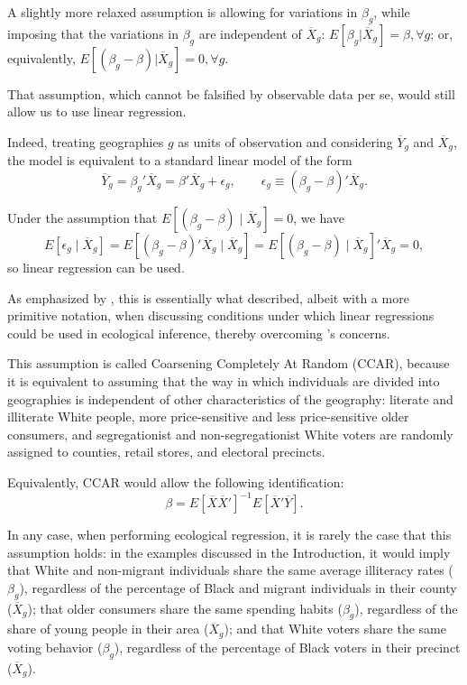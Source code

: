 A slightly more relaxed assumption is allowing for variations in $\beta_g$, while imposing that the variations in $\beta_g$ are independent of $\overline{X}_g$: $E[\beta_g|\overline{X}_g] = \beta, \forall g$; or, equivalently, $E[(\beta_g-\beta)|\overline{X}_g] = 0, \forall g$.

That assumption, which cannot be falsified by observable data per se, would still allow us to use linear regression.

Indeed, treating geographies $g$ as units of observation and considering $\overline{Y}_g$ and $\overline{X}_g$, the model is equivalent to a standard linear model of the form
\[
\overline{Y}_g = \beta_g' \overline{X}_g = \beta' \overline{X}_g + \epsilon_g,
\qquad
\epsilon_g \equiv (\beta_g - \beta)'\overline{X}_g.
\]

Under the assumption that $E[(\beta_g - \beta) \mid \overline{X}_g] = 0$, we have
\[
E[\epsilon_g \mid \overline{X}_g]
= E[(\beta_g - \beta)' \overline{X}_g \mid \overline{X}_g]
= E[(\beta_g - \beta) \mid \overline{X}_g]' \overline{X}_g = 0,
\]
so linear regression can be used.

As emphasized by \citet{kuriwaki2026roleconfounderslinearityecological}, this is essentially what \citet{Goodman1953} described, albeit with a more primitive notation, when discussing conditions under which linear regressions could be used in ecological inference, thereby overcoming \citet{Robinson1950}'s concerns.

This assumption is called Coarsening Completely At Random (CCAR), because it is equivalent to assuming that the way in which individuals are divided into geographies is independent of other characteristics of the geography: literate and illiterate White people, more price-sensitive and less price-sensitive older consumers, and segregationist and non-segregationist White voters are randomly assigned to counties, retail stores, and electoral precincts.

Equivalently, CCAR would allow the following identification:
\[
\beta = E[\overline{X}\overline{X}']^{-1} E[\overline{X}'\overline{Y}].
\]

In any case, when performing ecological regression, it is rarely the case that this assumption holds: in the examples discussed in the Introduction, it would imply that White and non-migrant individuals share the same average illiteracy rates ($\beta_g$), regardless of the percentage of Black and migrant individuals in their county ($\overline{X}_g$); that older consumers share the same spending habits ($\beta_g$), regardless of the share of young people in their area ($\overline{X}_g$); and that White voters share the same voting behavior ($\beta_g$), regardless of the percentage of Black voters in their precinct ($\overline{X}_g$).

